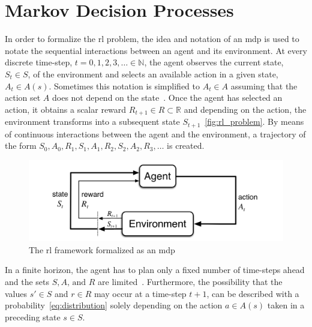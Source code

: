 \documentclass[draft,final]{vutinfth} %
\newcommand{\p}[1]{see p. #1}
\begin{document}
    \section{Markov Decision Processes}
    In order to formalize the \gls{rl} problem, the idea and notation of an \gls{mdp} is used to notate the sequential interactions between an agent and its environment.
    At every discrete time-step, $t = 0,1,2,3, \ldots \in \mathbb{N}$, the agent observes the current state, $S_t \in \mathit{S}$, of the environment and selects an available action in a given state, $A_t \in \mathit{A}(s)$.
    Sometimes this notation is simplified to $A_t \in \mathit{A}$ assuming that the action set $\mathit{A}$ does not depend on the state~\citep[\p{48}]{sutton_reinforcement_2018}.
    Once the agent has selected an action, it obtains a scalar reward $R_{t+1} \in \mathit{R} \subset \mathbb{R}$ and depending on the action, the environment transforms into a subsequent state $S_{t+1}$~\eqref{fig:rl_problem}.
    By means of continuous interactions between the agent and the environment, a trajectory of the form $S_0,A_0,R_1,S_1,A_1,R_2,S_2,A_2,R_3,\ldots$ is created.

    \begin{figure}[h]
        \centering
        \includegraphics[width=\textwidth]{figures/rl_problem.png}
        \caption[The \gls{rl} framework formalized as an \gls{mdp}]{The \gls{rl} framework formalized as an \gls{mdp}\protect\footnotemark}
        \label{fig:rl_problem}
    \end{figure}

    \footnotetext{\cite[\p{48}]{sutton_reinforcement_2018}}

    In a finite horizon, the agent has to plan only a fixed number of time-steps ahead and the sets $\mathit{S},\mathit{A}\text{, and }\mathit{R}$ are limited~\citep[\p{47f}]{sutton_reinforcement_2018,kaelbling_reinforcement_1996}.
    Furthermore, the possibility that the values $s'\in \mathit{S}$ and $r \in \mathit{R}$ may occur at a time-step $t+1$, can be described with a probability~\eqref{eq:distribution} solely depending on the action $a \in \mathit{A}(s)$ taken in a preceding state $s \in \mathit{S}$.
\end{document}
